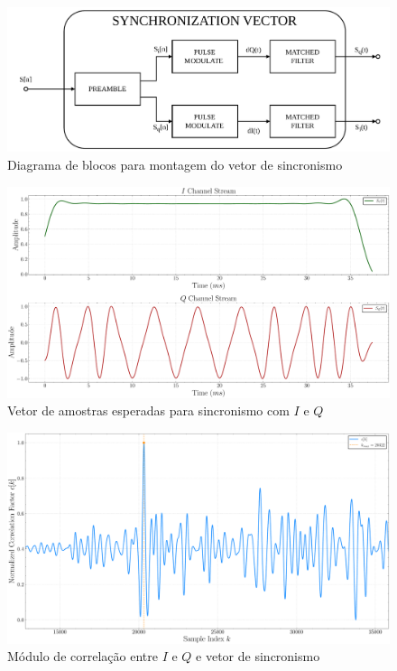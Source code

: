 \begin{figure}[H]
	\centering
	\caption{Diagrama de blocos para montagem do vetor de sincronismo}\label{fig:receiver_sync_diagram}
	\includegraphics[width=\linewidth]{assets/diagrams/sync.pdf}
\end{figure}


\begin{figure}[H]
	\centering
	\caption{Vetor de amostras esperadas para sincronismo com $I$ e $Q$}\label{fig:receiver_sync_word}
	\includegraphics[width=\linewidth]{assets/cap3/example_synchronizer_word.pdf}
\end{figure}

\begin{figure}[H]
	\centering
	\caption{Módulo de correlação entre $I$ e $Q$ e vetor de sincronismo}\label{fig:receiver_corr}
	\includegraphics[width=\linewidth]{assets/cap3/receiver_sync_corr.pdf}
\end{figure}


